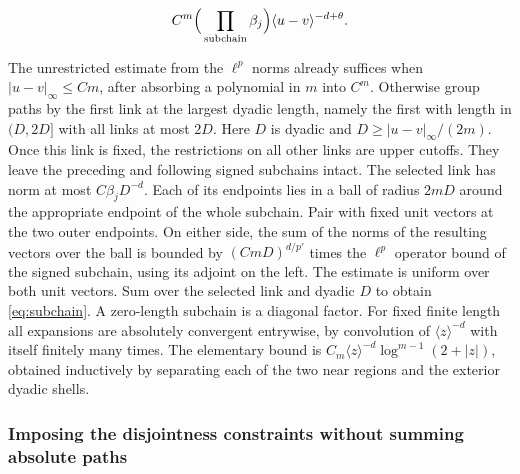 \documentclass[11pt]{article}
\begin{document}
\begin{equation}\label{eq:subchain}
C^m\Big(\prod_{\rm subchain}\beta_j\Big)\langle u-v\rangle^{-d+\theta}.
\end{equation}

The unrestricted estimate from the \(\ell^p\) norms already suffices when \(|u-v|_\infty\le C m\), after absorbing a polynomial in \(m\) into \(C^m\). Otherwise group paths by the first link at the largest dyadic length, namely the first with length in \((D,2D]\) with all links at most \(2D\). Here \(D\) is dyadic and \(D\ge|u-v|_\infty/(2m)\). Once this link is fixed, the restrictions on all other links are upper cutoffs. They leave the preceding and following signed subchains intact. The selected link has norm at most \(C\beta_jD^{-d}\). Each of its endpoints lies in a ball of radius \(2mD\) around the appropriate endpoint of the whole subchain. Pair with fixed unit vectors at the two outer endpoints. On either side, the sum of the norms of the resulting vectors over the ball is bounded by \((C mD)^{d/p'}\) times the \(\ell^p\) operator bound of the signed subchain, using its adjoint on the left. The estimate is uniform over both unit vectors. Sum over the selected link and dyadic \(D\) to obtain \eqref{eq:subchain}. A zero-length subchain is a diagonal factor. For fixed finite length all expansions are absolutely convergent entrywise, by convolution of \(\langle z\rangle^{-d}\) with itself finitely many times. The elementary bound is \(C_m\langle z\rangle^{-d}\log^{m-1}(2+|z|)\), obtained inductively by separating each of the two near regions and the exterior dyadic shells.

\subsubsection{Imposing the disjointness constraints without summing absolute paths}\label{imposing-the-disjointness-constraints-without-summing-absolute-paths}
\end{document}
